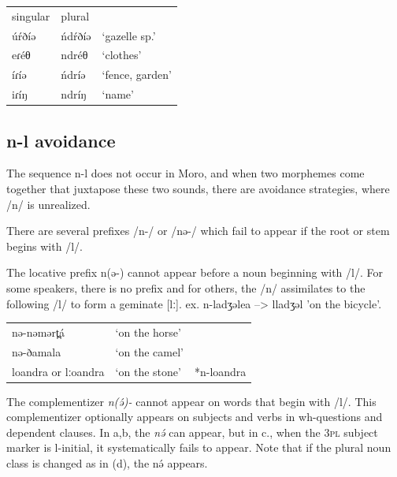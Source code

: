 \ea
\begin{tabular}[t]{lll}
singular	&	plural\\
úŕðíə	&	ńdŕðíə	&	 ‘gazelle sp.’\\
eɾéθ	&	ndréθ	&	‘clothes’\\
íɾíə	&	ńdríə	&	‘fence, garden’\\
iɾíŋ	&	ndríŋ	&	‘name’\\
\end{tabular}
\z


\subsection{n-l avoidance}
The sequence n-l does not occur in Moro, and when two morphemes come together that juxtapose these two sounds, there are avoidance strategies, where /n/ is unrealized. 

There are several prefixes /n-/ or /nə-/ which fail to appear if the root or stem begins with /l/.

The locative prefix n(ə-) cannot appear before a noun beginning with /l/. For some speakers, there is no prefix and for others, the /n/ assimilates to the following /l/ to form a geminate [lː]. ex. n-ladʒəlea --> lladʒəl 'on the bicycle'. 

\ea
\begin{tabular}[t]{lll}
nə-nəmərt̪á	&	‘on the horse’\\
nə-ðamala	&	‘on the camel’\\
loandra	or lːoandra	&	‘on the stone’	&	*n-loandra\\
\end{tabular}
\z

The complementizer \textit{n(ə́)-} cannot appear on words that begin with /l/. This complementizer optionally appears on subjects and verbs in wh-questions and dependent clauses. In a,b, the \textit{nə́ }can appear, but in c., when the 3\textsc{pl} subject marker is l-initial, it systematically fails to appear. Note that if the plural noun class is changed as in (d), the nə́ appears. 

